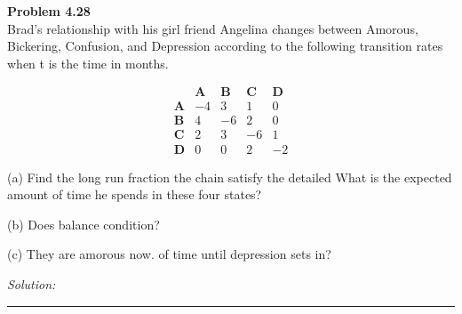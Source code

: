 \documentclass[a4paper, 11pt]{article}
\newenvironment{problem}[2][Problem]
    { \begin{mdframed}[backgroundcolor=gray!20] \textbf{#1 #2} \\}
    {  \end{mdframed}}
\newenvironment{solution}
    {\textit{Solution:}}
    {}
\begin{document}
\begin{problem}{4.28}
Brad’s relationship with his girl friend Angelina changes between Amorous, Bickering, Confusion, and Depression according to the following transition rates when t is the time in months.

$$
\begin{array}{ccccc} 
& \mathbf{A} & \mathbf{B} & \mathbf{C} & \mathbf{D} \\
\mathbf{A} & -4 & 3 & 1 & 0 \\
\mathbf{B} & 4 & -6 & 2 & 0 \\
\mathbf{C} & 2 & 3 & -6 & 1 \\
\mathbf{D} & 0 & 0 & 2 & -2
\end{array}
$$

(a) Find the long run fraction the chain satisfy the detailed What is the expected amount of time he spends in these four states?

(b) Does balance condition? 

(c) They are amorous now. of time until depression sets in?
\end{problem}
\begin{solution}

\end{solution} 
%
\noindent\rule{7in}{2.8pt}
\end{document}
